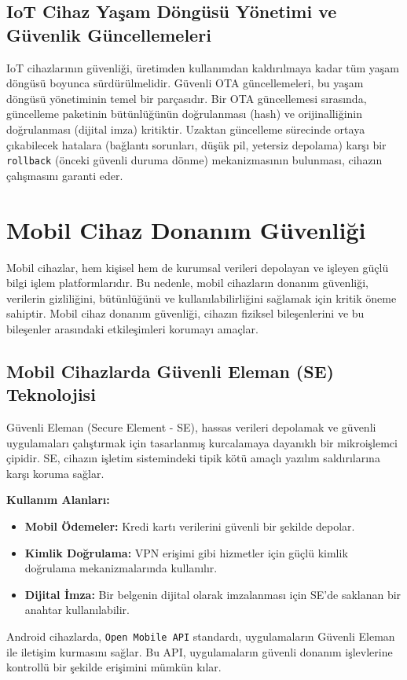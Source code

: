 \subsection{IoT Cihaz Yaşam Döngüsü Yönetimi ve Güvenlik Güncellemeleri}

IoT cihazlarının güvenliği, üretimden kullanımdan kaldırılmaya kadar tüm yaşam döngüsü boyunca sürdürülmelidir. Güvenli OTA güncellemeleri, bu yaşam döngüsü yönetiminin temel bir parçasıdır. Bir OTA güncellemesi sırasında, güncelleme paketinin bütünlüğünün doğrulanması (hash) ve orijinalliğinin doğrulanması (dijital imza) kritiktir. Uzaktan güncelleme sürecinde ortaya çıkabilecek hatalara (bağlantı sorunları, düşük pil, yetersiz depolama) karşı bir \verb|rollback| (önceki güvenli duruma dönme) mekanizmasının bulunması, cihazın çalışmasını garanti eder.

\section{Mobil Cihaz Donanım Güvenliği}
Mobil cihazlar, hem kişisel hem de kurumsal verileri depolayan ve işleyen güçlü bilgi işlem platformlarıdır. Bu nedenle, mobil cihazların donanım güvenliği, verilerin gizliliğini, bütünlüğünü ve kullanılabilirliğini sağlamak için kritik öneme sahiptir. Mobil cihaz donanım güvenliği, cihazın fiziksel bileşenlerini ve bu bileşenler arasındaki etkileşimleri korumayı amaçlar.

\subsection{Mobil Cihazlarda Güvenli Eleman (SE) Teknolojisi}

Güvenli Eleman (Secure Element - SE), hassas verileri depolamak ve güvenli uygulamaları çalıştırmak için tasarlanmış kurcalamaya dayanıklı bir mikroişlemci çipidir. SE, cihazın işletim sistemindeki tipik kötü amaçlı yazılım saldırılarına karşı koruma sağlar.

\textbf{Kullanım Alanları:}
\begin{itemize}
    \item \textbf{Mobil Ödemeler:} Kredi kartı verilerini güvenli bir şekilde depolar.
    \item \textbf{Kimlik Doğrulama:} VPN erişimi gibi hizmetler için güçlü kimlik doğrulama mekanizmalarında kullanılır.
    \item \textbf{Dijital İmza:} Bir belgenin dijital olarak imzalanması için SE'de saklanan bir anahtar kullanılabilir.
\end{itemize}
Android cihazlarda, \verb|Open Mobile API| standardı, uygulamaların Güvenli Eleman ile iletişim kurmasını sağlar. Bu API, uygulamaların güvenli donanım işlevlerine kontrollü bir şekilde erişimini mümkün kılar.

